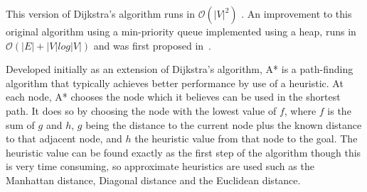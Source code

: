 This version of Dijkstra's algorithm runs in $\mathcal{O}(|V|^{2})$
\cite{xu2007improved}. An improvement to this original algorithm using a
min-priority queue implemented using a heap, runs in $\mathcal{O}
(|E| + |V|log |V|)$ and was first proposed in~\cite{fredman1987fibonacci}.


Developed initially as an extension of Dijkstra's algorithm, A* is a
path-finding algorithm that typically achieves better performance by
use of a heuristic. At each node, A* chooses the node which it believes
can be used in the shortest path. It does so by choosing the node with
the lowest value of $f$, where $f$ is the sum of $g$ and $h$, $g$ being the
distance to the current node plus the known distance to that adjacent
node, and $h$ the heuristic value from that node to the goal. The heuristic
value can be found exactly as the first step of the algorithm though
this is very time consuming, so approximate heuristics are used such
as the Manhattan distance, Diagonal distance and the Euclidean distance.
